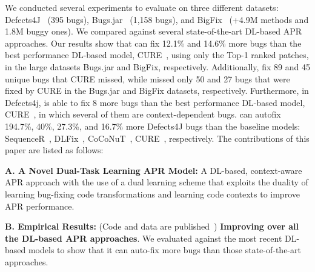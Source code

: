 We conducted several experiments to evaluate {\tool} on three
different datasets: Defects4J~\cite{defects4j} (395 bugs),
Bugs.jar~\cite{saha2018bugs} (1,158 bugs), and
BigFix~\cite{yioopsla19} (+4.9M methods and 1.8M buggy ones).  
We compared {\tool} against several state-of-the-art DL-based APR
approaches. 
Our results show that {\tool} can fix 12.1\% and 14.6\% more bugs than the best performance DL-based model, CURE~\cite{cure-icse21}, using only the Top-1 ranked patches,  in the large datasets Bugs.jar and BigFix, respectively. 
Additionally, {\tool} fix 89 and 45 unique bugs that CURE missed, while {\tool} missed only 50 and 27 bugs that were fixed by CURE in the Bugs.jar and BigFix datasets, respectively. 
Furthermore, in Defects4j, {\tool} is able to fix 8 more bugs than the best performance DL-based model, CURE~\cite{cure-icse21}, in which several of them are context-dependent bugs. {\tool} can autofix 194.7\%, 40\%, 27.3\%, and 16.7\% more Defects4J bugs than the baseline models: SequenceR~\cite{chen2018sequencer}, DLFix~\cite{li2020dlfix}, CoCoNuT~\cite{lutellier2020coconut}, CURE~\cite{cure-icse21}, respectively. 
The contributions of this paper are listed as follows:


{\bf A. A Novel Dual-Task Learning APR Model:} A DL-based,
context-aware APR approach with the use of a dual learning scheme that
exploits the duality of learning bug-fixing code transformations and
learning code contexts to improve APR performance.

{\bf B. Empirical Results:} (Code and data are published~\cite{AutoFix2019})
{\bf Improving over all the DL-based APR approaches}. We evaluated
{\tool} against the most recent DL-based models to show that it can
auto-fix more bugs than those state-of-the-art approaches.

